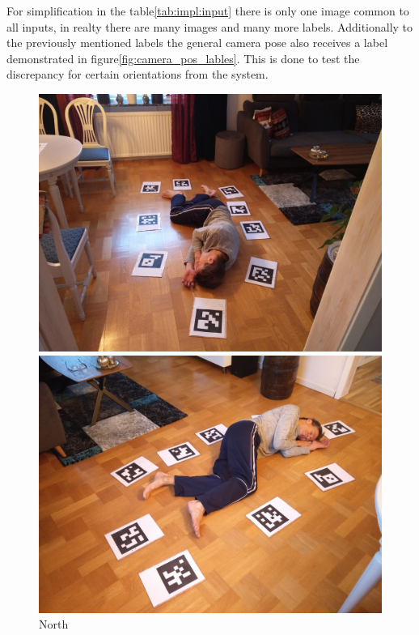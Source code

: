 For simplification in the table\ref{tab:impl:input} there is only one image common to all inputs, in realty there are many images and many more labels.
Additionally to the previously mentioned labels the general camera pose also receives a label demonstrated in figure\ref{fig:camera_pos_lables}.
This is done to test the discrepancy for certain orientations from the \openpose{ }  system.

\begin{figure}
\begin{center}
    \begin{minipage}[t]{0.2\textwidth}
        \includegraphics[width=\textwidth]{images/datasets/P2/images/093311.jpg}
        \caption*{North}
    \end{minipage}
    \begin{minipage}[t]{0.2\textwidth}
        \includegraphics[width=\textwidth]{images/datasets/P2/images/093409.jpg}

\end{minipage}
\end{center}
\end{figure}
